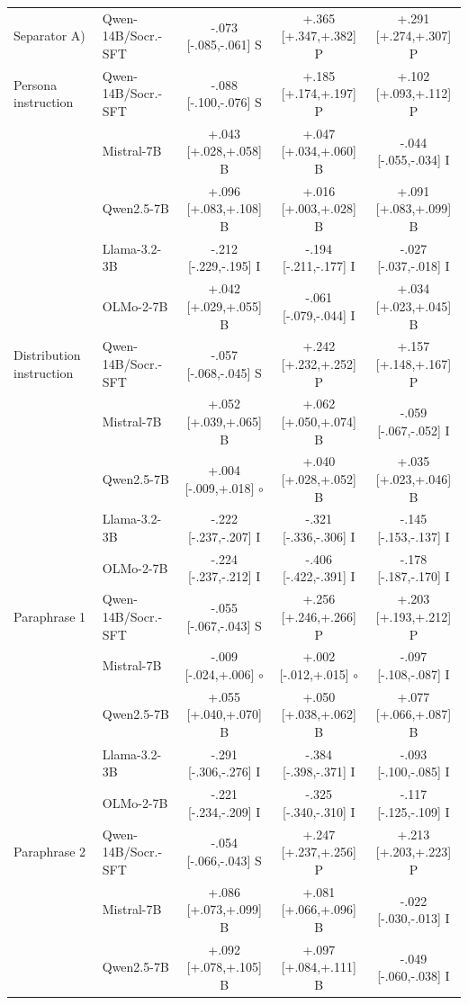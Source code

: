 \begin{table}[t]
\begin{tabular}{@{}llccc@{}}
\addlinespace[1pt]
Separator A) & Qwen-14B/Socr.-SFT & -.073 [-.085,-.061] S & +.365 [+.347,+.382] P & +.291 [+.274,+.307] P \\
\addlinespace[1pt]
Persona instruction & Qwen-14B/Socr.-SFT & -.088 [-.100,-.076] S & +.185 [+.174,+.197] P & +.102 [+.093,+.112] P \\
 & Mistral-7B & +.043 [+.028,+.058] B & +.047 [+.034,+.060] B & -.044 [-.055,-.034] I \\
 & Qwen2.5-7B & +.096 [+.083,+.108] B & +.016 [+.003,+.028] B & +.091 [+.083,+.099] B \\
 & Llama-3.2-3B & -.212 [-.229,-.195] I & -.194 [-.211,-.177] I & -.027 [-.037,-.018] I \\
 & OLMo-2-7B & +.042 [+.029,+.055] B & -.061 [-.079,-.044] I & +.034 [+.023,+.045] B \\
\addlinespace[1pt]
Distribution instruction & Qwen-14B/Socr.-SFT & -.057 [-.068,-.045] S & +.242 [+.232,+.252] P & +.157 [+.148,+.167] P \\
 & Mistral-7B & +.052 [+.039,+.065] B & +.062 [+.050,+.074] B & -.059 [-.067,-.052] I \\
 & Qwen2.5-7B & +.004 [-.009,+.018] $\circ$ & +.040 [+.028,+.052] B & +.035 [+.023,+.046] B \\
 & Llama-3.2-3B & -.222 [-.237,-.207] I & -.321 [-.336,-.306] I & -.145 [-.153,-.137] I \\
 & OLMo-2-7B & -.224 [-.237,-.212] I & -.406 [-.422,-.391] I & -.178 [-.187,-.170] I \\
\addlinespace[1pt]
Paraphrase 1 & Qwen-14B/Socr.-SFT & -.055 [-.067,-.043] S & +.256 [+.246,+.266] P & +.203 [+.193,+.212] P \\
 & Mistral-7B & -.009 [-.024,+.006] $\circ$ & +.002 [-.012,+.015] $\circ$ & -.097 [-.108,-.087] I \\
 & Qwen2.5-7B & +.055 [+.040,+.070] B & +.050 [+.038,+.062] B & +.077 [+.066,+.087] B \\
 & Llama-3.2-3B & -.291 [-.306,-.276] I & -.384 [-.398,-.371] I & -.093 [-.100,-.085] I \\
 & OLMo-2-7B & -.221 [-.234,-.209] I & -.325 [-.340,-.310] I & -.117 [-.125,-.109] I \\
\addlinespace[1pt]
Paraphrase 2 & Qwen-14B/Socr.-SFT & -.054 [-.066,-.043] S & +.247 [+.237,+.256] P & +.213 [+.203,+.223] P \\
 & Mistral-7B & +.086 [+.073,+.099] B & +.081 [+.066,+.096] B & -.022 [-.030,-.013] I \\
 & Qwen2.5-7B & +.092 [+.078,+.105] B & +.097 [+.084,+.111] B & -.049 [-.060,-.038] I \\

\end{tabular}
\end{table}
